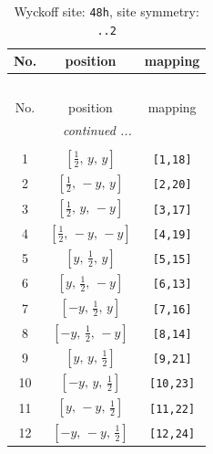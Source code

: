 \documentclass[fleqn,8pt]{jsarticle}
\begin{document}
\begin{longtable}{ccc}
\caption{Wyckoff site: {\tt 48h}, site symmetry: {\tt ..2}}
 \\
 \hline \hline
No. & position & mapping \\ \hline \endfirsthead

\multicolumn{2}{l}{\tablename\ \thetable{}} \\
 \hline \hline
No. & position & mapping \\ \hline \endhead

 \hline \hline
\multicolumn{2}{r}{\footnotesize\it continued ...} \\ \endfoot

 \hline \hline
\multicolumn{2}{r}{} \\ \endlastfoot

1 & $\left[ \frac{1}{2},\, y,\, y \right]$ & {\tt [1,18]} \\ \hline
2 & $\left[ \frac{1}{2},\, - y,\, y \right]$ & {\tt [2,20]} \\ \hline
3 & $\left[ \frac{1}{2},\, y,\, - y \right]$ & {\tt [3,17]} \\ \hline
4 & $\left[ \frac{1}{2},\, - y,\, - y \right]$ & {\tt [4,19]} \\ \hline
5 & $\left[ y,\, \frac{1}{2},\, y \right]$ & {\tt [5,15]} \\ \hline
6 & $\left[ y,\, \frac{1}{2},\, - y \right]$ & {\tt [6,13]} \\ \hline
7 & $\left[ - y,\, \frac{1}{2},\, y \right]$ & {\tt [7,16]} \\ \hline
8 & $\left[ - y,\, \frac{1}{2},\, - y \right]$ & {\tt [8,14]} \\ \hline
9 & $\left[ y,\, y,\, \frac{1}{2} \right]$ & {\tt [9,21]} \\ \hline
10 & $\left[ - y,\, y,\, \frac{1}{2} \right]$ & {\tt [10,23]} \\ \hline
11 & $\left[ y,\, - y,\, \frac{1}{2} \right]$ & {\tt [11,22]} \\ \hline
12 & $\left[ - y,\, - y,\, \frac{1}{2} \right]$ & {\tt [12,24]} \\
\end{longtable}
\renewcommand{\arraystretch}{1.2}
\end{document}
